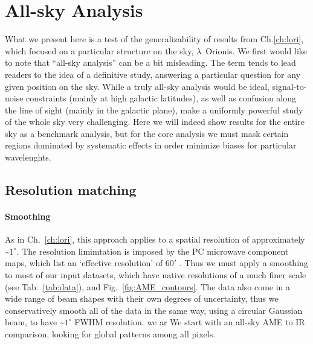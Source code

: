 \chapter{All-sky Analysis}
  \label{sec:analysis}
    What we present here is a test of the generalizability of results from Ch.\ref{ch:lori}, which focused on a particular structure on the sky, $\lambda$~Orionis.
    We first would like to note that ``all-sky analysis'' can be a bit misleading. The term tends to lead readers to the idea of a definitive study, answering a particular question for any given position on the sky.  While a truly all-sky analysis would be ideal, signal-to-noise constraints (mainly at high galactic latitudes), as well as confusion along the line of sight (mainly in the galactic plane), make a uniformly powerful study of the whole sky very challenging. Here we will indeed show results for the entire sky as a benchmark analysis, but for the core analysis we must mask certain regions dominated by systematic effects in order minimize biases for particular wavelenghts.

\section{Resolution matching}
    \subsubsection{Smoothing}
        As in Ch.~\ref{ch:lori}, this approach applies to a spatial resolution of approximately \textasciitilde{}$1^{\circ}$. The resolution limimtation is imposed by the PC microwave component maps, which list an `effective resolution' of 60$'$ \citep{planck15X}. Thus we must apply a smoothing to most of our input datasets, which have native resolutions of a much finer scale (see Tab.~\ref{tab:data}), and Fig.~\ref{fig:AME_contours}. The data also come in a wide range of beam shapes with their own degrees of uncertainty, thus we conservatively smooth all of the data in the same way, using a circular Gaussian beam, to have \textasciitilde{}$1^{\circ}$ FWHM resolution. we ar We start with an all-sky AME to IR comparison, looking for global patterns among all pixels.

